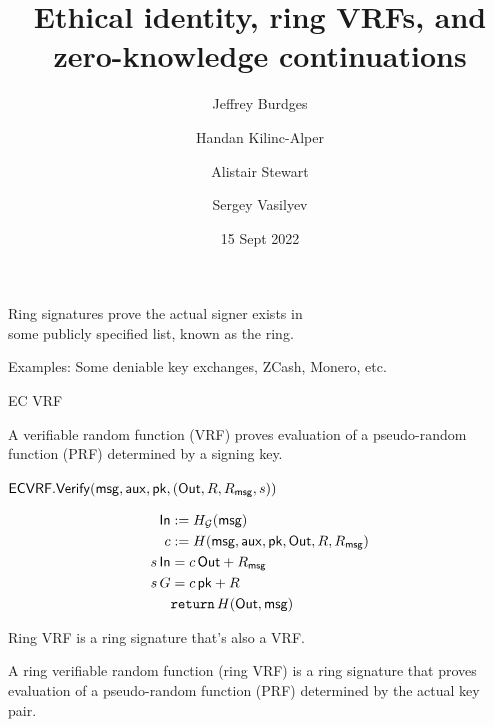\documentclass{beamer}
\title{Ethical identity, ring VRFs, and \\ zero-knowledge continuations}
\author{Jeffrey Burdges \and Handan Kilinc-Alper \and Alistair Stewart \and Sergey Vasilyev}
\date{15 Sept 2022}
\begin{document}
\maketitle



\begin{frame}
	
	Ring signatures prove the actual signer exists in \\
	\hspace{10pt} some publicly specified list, known as the ring. 
	
	\bigskip
	
	Examples:  Some deniable key exchanges, ZCash, Monero, etc.
	
\end{frame}



\begin{frame}{EC VRF}

A verifiable random function (VRF) proves evaluation of a pseudo-random function (PRF) determined by a signing key.

\bigskip\bigskip

$\mathsf{ECVRF}.{\mathsf{Verify}}(\mathsf{msg},\mathsf{aux},\mathsf{pk},({\mathsf{Out}},R,R_\mathsf{msg},s))$
	
$$ \begin{aligned}
{\ensuremath{\mathsf{In}}} &:= H_{\mathcal{G}}(\mathsf{msg}) \\
c &:= H(\mathsf{msg},\mathsf{aux},\mathsf{pk},{\mathsf{Out}},R,R_\mathsf{msg}) \\
s \, {\mathsf{In}} &= c \, {\mathsf{Out}} + R_\mathsf{msg} \\
s \, G &= c \, \mathsf{pk} + R \\
& \mathtt{return}\, H({\mathsf{Out}},\mathsf{msg}) \\
\end{aligned} $$
	
\end{frame}



\begin{frame}

Ring VRF is a ring signature that's also a VRF.

\bigskip\bigskip 

A ring verifiable random function (ring VRF) is a ring signature that proves evaluation of a pseudo-random function (PRF) determined by the actual key pair.

\end{frame}
\end{document}
